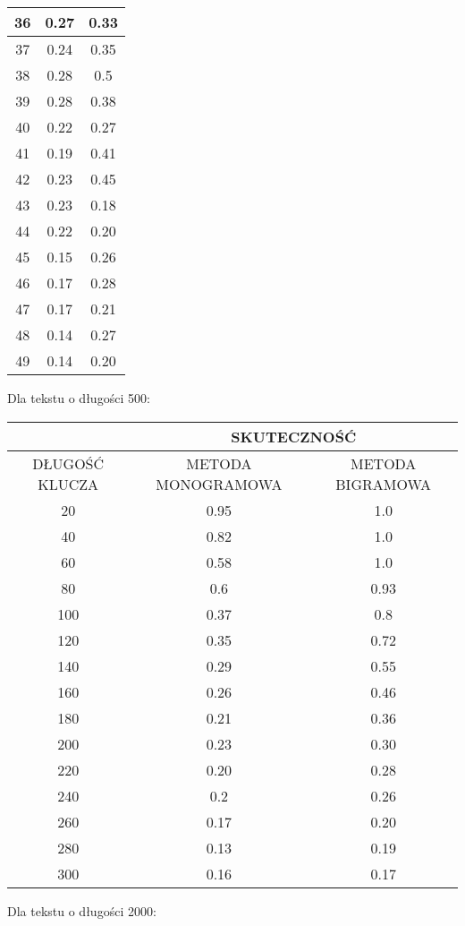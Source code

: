 \documentclass[a4paper]{article}
\begin{document}
\begin{center}
\begin{tabular}{
|c|c|c|}
36
 & 0.27 & 0.33\\ \hline
37
 & 0.24 & 0.35\\ \hline
38
 & 0.28 & 0.5\\ \hline
39
 & 0.28 & 0.38\\ \hline
40
 & 0.22 & 0.27\\ \hline
41
 & 0.19 & 0.41\\ \hline
42
 & 0.23 & 0.45\\ \hline
43
 & 0.23 & 0.18\\ \hline
44
 & 0.22 & 0.20\\ \hline
45
 & 0.15 & 0.26\\ \hline
46
 & 0.17 & 0.28\\ \hline
47
 & 0.17 & 0.21\\ \hline
48
 & 0.14 & 0.27\\ \hline
49
 & 0.14 & 0.20\\ \hline
\end{tabular}\end{center}
Dla tekstu o długości 500:
\begin{center}\begin{tabular}{
|c|c|c|}
\hline &\multicolumn{2}{|c|}{SKUTECZNOŚĆ} \\
\hline DŁUGOŚĆ KLUCZA & METODA MONOGRAMOWA & METODA BIGRAMOWA\\ \hline
20
 & 0.95 & 1.0\\ \hline
40
 & 0.82 & 1.0\\ \hline
60
 & 0.58 & 1.0\\ \hline
80
 & 0.6 & 0.93\\ \hline
100
 & 0.37 & 0.8\\ \hline
120
 & 0.35 & 0.72\\ \hline
140
 & 0.29 & 0.55\\ \hline
160
 & 0.26 & 0.46\\ \hline
180
 & 0.21 & 0.36\\ \hline
200
 & 0.23 & 0.30\\ \hline
220
 & 0.20 & 0.28\\ \hline
240
 & 0.2 & 0.26\\ \hline
260
 & 0.17 & 0.20\\ \hline
280
 & 0.13 & 0.19\\ \hline
300
 & 0.16 & 0.17\\ \hline
\end{tabular}\end{center}
Dla tekstu o długości 2000:
\end{document}

